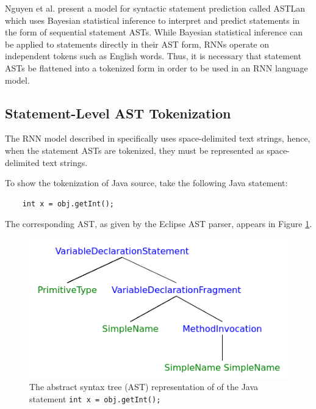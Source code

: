 \documentclass{article}
\begin{document}
Nguyen et al. \cite{Nguyen} present a model for syntactic statement prediction 
called ASTLan which uses Bayesian statistical inference to interpret and 
predict statements in the form of sequential statement ASTs. While Bayesian 
statistical inference can be applied to statements directly in their AST 
form, RNNs operate on independent tokens such as English words. Thus, it is 
necessary that statement ASTs be flattened into a tokenized form in order to 
be used in an RNN language model.

\subsection{Statement-Level AST Tokenization}

The RNN model described in \citet{LSTMArticle} specifically uses space-delimited 
text strings, hence, when the statement ASTs are tokenized, they 
must be represented as space-delimited text strings.

To show the tokenization of Java source, take the following Java statement:

\begin{verbatim}
    int x = obj.getInt();
\end{verbatim}

The corresponding AST, as given by the Eclipse AST parser, appears in Figure \ref{ast-figure}.

\begin{figure}[ht]
\vskip 0.2in
\begin{center}
\centerline{\includegraphics[width=\columnwidth]{ast.png}}
\caption{The abstract syntax tree (AST) representation of of the Java statement \texttt{int x = obj.getInt();}}
\label{ast-figure}
\end{center}
\vskip -0.2in
\end{figure} 
\end{document}
